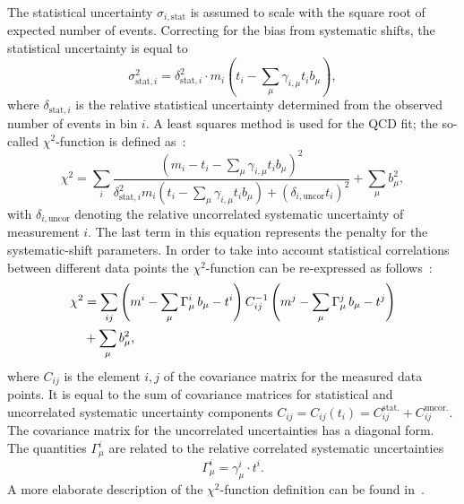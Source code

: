 The statistical uncertainty $\sigma_{i,\text{stat}}$ is assumed to scale with the square root of expected number of events. Correcting for the bias from systematic shifts, the statistical uncertainty is equal to
\begin{equation}
 \sigma_{\text{stat},i}^2 = \delta_{\text{stat},i}^2\cdot m_i\left( t_i - \sum_\mu\gamma_{i,\mu}t_ib_\mu \right),
\end{equation}
where $\delta_{\text{stat},i}$ is the relative statistical uncertainty determined from the observed number of events in bin $i$. A least squares method is used for the QCD fit; the so-called $\chi^2$-function is defined as~\cite{Aaron:2009aa}:
\begin{equation}
 \chi^2 = \sum_i{ \frac{\left( m_i-t_i-\sum_{\mu}{\gamma_{i,\mu} t_i b_\mu} \right)^2 }{ \delta_{\text{stat},i}^2 m_i \left( t_i - \sum_\mu{\gamma_{i,\mu}t_ib_\mu} \right)+ \left( \delta_{i,\text{uncor}}t_i\right)^2 } } + \sum_{\mu}{b_\mu^2},
 \label{eq:chi2uncorr}
\end{equation}
with $\delta_{i,\text{uncor}}$ denoting the relative uncorrelated systematic uncertainty of measurement $i$. The last term in this equation represents the penalty for the systematic-shift parameters. In order to take into account statistical correlations between different data points the $\chi^2$-function can be re-expressed as follows~\cite{Aaron:2009aa}:
\begin{align}
 \chi^2 &= \sum_{ij}{\left( m^i -\sum_{\mu}{\Gamma_\mu^i\,b_\mu - t^i }\right) C^{-1}_{ij} \left( m^j -\sum_{\mu}{\Gamma_\mu^j\,b_\mu - t^j }\right) }\notag\\
                                           &+ \sum_{\mu}{b_\mu^2},
 \label{eq:chi2corr}
\end{align}
where $C_{ij}$ is the element $i,j$ of the covariance matrix for the measured data points. It is equal to the sum of covariance matrices for statistical and uncorrelated systematic uncertainty components $C_{ij}=C_{ij}\left(t_i\right)=C_{ij}^{\text{stat.}}+C_{ij}^{\text{uncor.}}$. The covariance matrix for the uncorrelated uncertainties has a diagonal form. The quantities $\Gamma_\mu^i$ are related to the relative correlated systematic uncertainties
\begin{equation}
 \Gamma_{\mu}^i = \gamma_{\mu}^i \cdot t^i. 
\end{equation}
A more elaborate description of the $\chi^2$-function definition can be found in~\cite{herafitter:2014:manual}.

